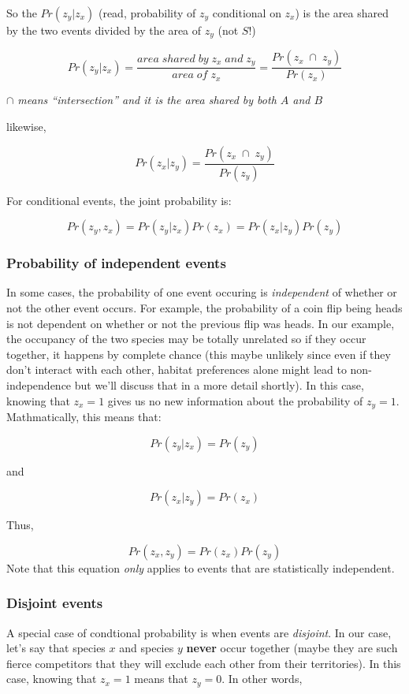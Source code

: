 \documentclass[]{article}
\begin{document}
So the \(Pr(z_y|z_x)\) (read, probability of \(z_y\) conditional on
\(z_x\)) is the area shared by the two events divided by the area of
\(z_y\) (not \(S\)!)

\[Pr(z_y|z_x) = \frac{area\; shared\; by\; z_x\; and\; z_y}{area\; of \;z_x} = \frac{Pr(z_x\; \cap\; z_y)}{Pr(z_x)}\]

\emph{\(\cap\) means ``intersection'' and it is the area shared by both
\(A\) and \(B\)}

likewise,

\[Pr(z_x|z_y) = \frac{Pr(z_x\; \cap\; z_y)}{Pr(z_y)}\]

For conditional events, the joint probability is:

\[Pr(z_y, z_x) = Pr(z_y|z_x)Pr(z_x) = Pr(z_x|z_y)Pr(z_y)\]

\hypertarget{probability-of-independent-events}{%
\subsubsection{Probability of independent
events}\label{probability-of-independent-events}}

In some cases, the probability of one event occuring is
\emph{independent} of whether or not the other event occurs. For
example, the probability of a coin flip being heads is not dependent on
whether or not the previous flip was heads. In our example, the
occupancy of the two species may be totally unrelated so if they occur
together, it happens by complete chance (this maybe unlikely since even
if they don't interact with each other, habitat preferences alone might
lead to non-independence but we'll discuss that in a more detail
shortly). In this case, knowing that \(z_x=1\) gives us no new
information about the probability of \(z_y=1\). Mathmatically, this
means that:

\[Pr(z_y|z_x) = Pr(z_y)\]

and

\[Pr(z_x|z_y) = Pr(z_x)\]

Thus,

\[Pr(z_x,z_y) = Pr(z_x)Pr(z_y)\] Note that this equation \emph{only}
applies to events that are statistically independent.

\hypertarget{disjoint-events}{%
\subsubsection{Disjoint events}\label{disjoint-events}}

A special case of condtional probability is when events are
\emph{disjoint}. In our case, let's say that species \(x\) and species
\(y\) \textbf{never} occur together (maybe they are such fierce
competitors that they will exclude each other from their territories).
In this case, knowing that \(z_x = 1\) means that \(z_y = 0\). In other
words,
\end{document}
